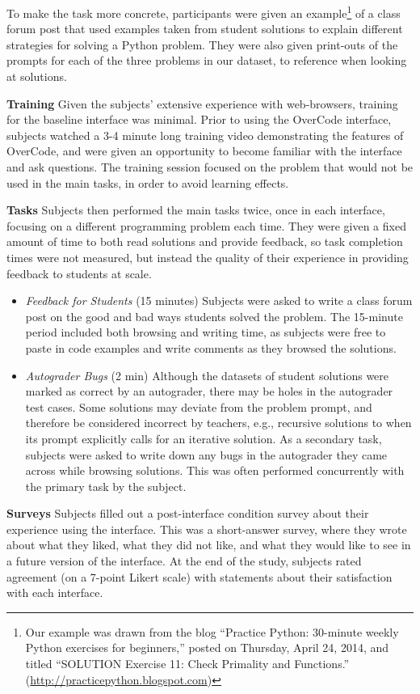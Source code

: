 To make the task more concrete, participants were given an example\footnote{Our example was drawn from the blog ``Practice Python: 30-minute weekly Python exercises for beginners,'' posted on Thursday, April 24, 2014, and titled ``SOLUTION Exercise 11: Check Primality and Functions.'' (\url{http://practicepython.blogspot.com})} of a class forum post that used examples taken from student solutions to explain different strategies for solving a Python problem. They were also given print-outs of the prompts for each of the three problems in our dataset, to reference when looking at solutions.

{\bf Training} Given the subjects' extensive experience with web-browsers, training for the baseline interface was minimal. Prior to using the OverCode interface, subjects watched a 3-4 minute long training video demonstrating the features of OverCode, and were given an opportunity to become familiar with the interface and ask questions. The training session focused on the problem that would not be used in the main tasks, in order to avoid learning effects.

{\bf Tasks} Subjects then performed the main tasks twice, once in each interface, focusing on a different programming problem each time. They were given a fixed amount of time to both read solutions and provide feedback, so task completion times were not measured, but instead the quality of their experience in providing feedback to students at scale.

\begin{itemize}
\item {\it Feedback for Students} (15 minutes) Subjects were asked to write a class forum post on the good and bad ways students solved the problem. The 15-minute period included both browsing and writing time, as subjects were free to paste in code examples and write comments as they browsed the solutions.

\item {\it Autograder Bugs} (2 min) Although the datasets of student solutions were marked as correct by an autograder, there may be holes in the autograder test cases. Some solutions may deviate from the problem prompt, and therefore be considered incorrect by teachers, e.g., recursive solutions to  when its prompt explicitly calls for an iterative solution. As a secondary task, subjects were asked to write down any bugs in the autograder they came across while browsing solutions. This was often performed concurrently with the primary task by the subject.
\end{itemize}
{\bf Surveys} Subjects filled out a post-interface condition survey about their experience using the interface. This was a short-answer survey, where they wrote about what they liked, what they did not like, and what they would like to see in a future version of the interface. At the end of the study, subjects rated agreement (on a 7-point Likert scale) with statements about their satisfaction with each interface.

